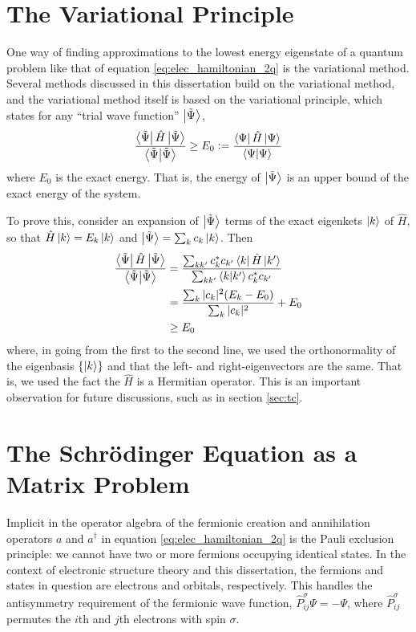 \section{The Variational Principle}
\label{sec:variational_principle}

One way of finding approximations to the lowest energy eigenstate of a quantum problem like that of equation \eqref{eq:elec_hamiltonian_2q} is the variational method. Several methods discussed in this dissertation build on the variational method, and the variational method itself is based on the variational principle, which states\cite{sakuraiModern2017} for any ``trial wave function'' $\ket{\tilde\Psi}$,
\begin{equation}
    \label{eq:variational_principle}
    \frac{\bra{\tilde\Psi}\hat H\ket{\tilde\Psi}}{\braket{\tilde\Psi}}
    \ge E_0 \mathrel{\mathop:}=  \frac{\bra{\Psi}\hat H\ket{\Psi}}{\braket{\Psi}}
\end{equation}
where $E_0$ is the exact energy. That is, the energy of $\ket{\tilde\Psi}$ is an upper bound of the exact energy of the system.

To prove this, consider an expansion of $\ket{\tilde\Psi}$ terms of the exact eigenkets $\ket k$ of $\hat H$, so that $\hat H\ket k = E_k\ket k$ and $\ket{\tilde\Psi}=\sum_kc_k\ket k$. Then
\begin{align}
\label{eq:var_proof}
    \begin{split}
    \frac{\bra{\tilde\Psi}\hat H\ket{\tilde\Psi}}{\braket{\tilde\Psi}}
    &=
    \frac{\sum_{kk'}c_k^*c_{k'}\bra{k}\hat H\ket{k'}}{\sum_{kk'}\bra{k}\ket{k'}c_k^*c_{k'}}\\
    &= \frac{\sum_k|c_k|^2(E_k-E_0)}{\sum_k|c_k|^2} + E_0 \\
    &\ge E_0
\end{split}
\end{align}
where, in going from the first to the second line, we used the orthonormality of the eigenbasis $\{\ket k\}$ and that the left- and right-eigenvectors are the same. That is, we used the fact the $\hat H$ is a Hermitian operator. This is an important observation for future discussions, such as in section \ref{sec:tc}.

\section{The Schr\"odinger Equation as a Matrix Problem}
\label{sec:matrix}

Implicit in the operator algebra of the fermionic creation and annihilation operators $a$ and $a^\dag$ in equation \eqref{eq:elec_hamiltonian_2q} is the Pauli exclusion principle: we cannot have two or more fermions occupying identical states. In the context of electronic structure theory and this dissertation, the fermions and states in question are electrons and orbitals, respectively. This handles the antisymmetry requirement of the fermionic wave function, $\hat P_{ij}^\sigma\Psi = -\Psi$, where $\hat P_{ij}^\sigma$ permutes the $i$th and $j$th electrons with spin $\sigma$.

